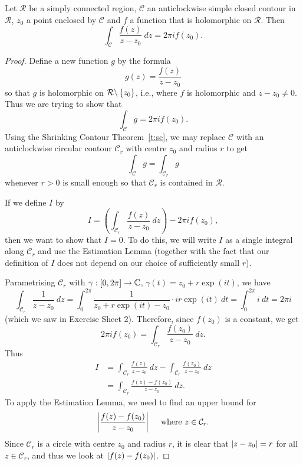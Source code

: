 




\begin{theorem}
\label{t:cauchyformula}
Let $\mathcal{R}$ be a simply connected region, $\mathcal{C}$ an anticlockwise simple closed contour in $\mathcal{R}$, $z_0$ a point enclosed by $\mathcal{C}$ and $f$ a function that is holomorphic on $\mathcal{R}$.  Then
\[
\int_{\mathcal{C}} \frac{f(z)}{z-z_0} \ dz = 2 \pi i f( z_0).
\]
\end{theorem}
\begin{proof}
Define a new function $g$ by the formula
\[
g(z) = \frac{f(z)}{z-z_0}
\]
so that $g$ is holomorphic on $\mathcal{R} \backslash \left\{z_0\right\}$, i.e., where $f$ is holomorphic and $z-z_0 \neq 0$.  Thus we are trying to show that
\[
\int_{\mathcal{C}} g = 2\pi i f(z_0).
\]
Using the Shrinking Contour Theorem~\ref{t:sc}, we may replace $\mathcal{C}$ with an anticlockwise circular contour $\mathcal{C}_r$ with centre $z_0$ and radius $r$ to get
\[
\int_{\mathcal{C}} g = \int_{\mathcal{C}_r} g
\]
whenever $r>0$ is small enough so that $\mathcal{C}_r$ is contained in $\mathcal{R}$.  

If we define $I$ by
\[
I = \left(\int_{\mathcal{C}_r} \frac{f(z)}{z-z_0}\ dz \right) - 2 \pi i f(z_0),
\]
then we want to show that $I=0$.  To do this, we will write $I$ as a single integral along $\mathcal{C}_r$ and use the Estimation Lemma (together with the fact that our definition of $I$ does not depend on our choice of sufficiently small $r$).

Parametrising $\mathcal{C}_r$ with $\gamma:[0,2\pi] \to \mathbb{C}$, $\gamma(t) = z_0 + r \exp (it)$, we have
\[
\int_{\mathcal{C}_r} \frac{1}{z-z_0}\ dz = \int_0^{2\pi} \frac{1}{z_0+r\exp(it)-z_0} \cdot i r\exp (it) \ dt = \int_0^{2\pi} i \ dt = 2 \pi i
\]
(which we saw in Exercise Sheet 2). Therefore, since $f(z_0)$ is a constant, we get
\[
2\pi i f(z_0) = \int_{\mathcal{C}_r} \frac{f(z_0)}{z-z_0}\ dz.
\]
Thus
\begin{align*}
I &= \int_{\mathcal{C}_r} \frac{f(z)}{z-z_0}\ dz - \int_{\mathcal{C}_r} \frac{f(z_0)}{z-z_0}\ dz \\
& = \int_{\mathcal{C}_r} \frac{f(z)-f(z_0)}{z-z_0}\ dz.
\end{align*}
To apply the Estimation Lemma, we need to find an upper bound for
\[
\left|  \frac{f(z)-f(z_0)}{z-z_0}  \right| \quad \text{ where } z \in \mathcal{C}_r.
\]
Since $\mathcal{C}_r$ is a circle with centre $z_0$ and radius $r$, it is clear that $\left| z-z_0 \right| = r$ for all $z \in \mathcal{C}_r$, and thus we look at $\left| f(z)-f(z_0) \right|$.


\end{proof}
